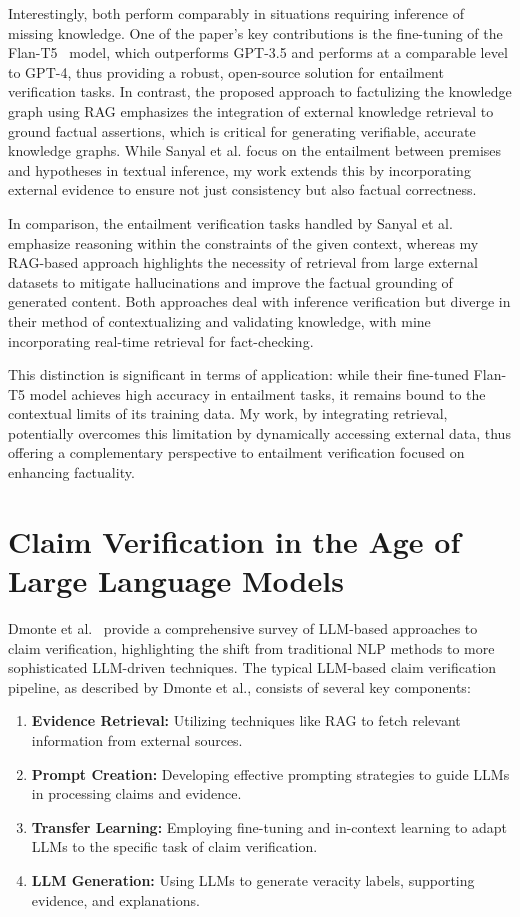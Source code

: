 Interestingly, both perform comparably in situations requiring inference of missing knowledge.
One of the paper's key contributions is the fine-tuning of the Flan-T5~\cite{https://doi.org/10.48550/arxiv.2210.11416} model, which outperforms GPT-3.5 and performs at a comparable level to GPT-4, thus providing a robust, open-source solution for entailment verification tasks.
In contrast, the proposed approach to factulizing the knowledge graph using \ac{RAG} emphasizes the integration of external knowledge retrieval to ground factual assertions, which is critical for generating verifiable, accurate knowledge graphs.
While Sanyal et al. focus on the entailment between premises and hypotheses in textual inference, my work extends this by incorporating external evidence to ensure not just consistency but also factual correctness.

In comparison, the entailment verification tasks handled by Sanyal et al. emphasize reasoning within the constraints of the given context, whereas my \ac{RAG}-based approach highlights the necessity of retrieval from large external datasets to mitigate hallucinations and improve the factual grounding of generated content.
Both approaches deal with inference verification but diverge in their method of contextualizing and validating knowledge, with mine incorporating real-time retrieval for fact-checking.

This distinction is significant in terms of application: while their fine-tuned Flan-T5 model achieves high accuracy in entailment tasks, it remains bound to the contextual limits of its training data.
My work, by integrating retrieval, potentially overcomes this limitation by dynamically accessing external data, thus offering a complementary perspective to entailment verification focused on enhancing factuality.

\section{Claim Verification in the Age of Large Language Models}\label{sec:claim-verification-in-the-age-of-large-language-models}
Dmonte et al.~\cite{dmonte2024claimverificationagelarge} provide a comprehensive survey of \ac{LLM}-based approaches to claim verification, highlighting the shift from traditional \ac{NLP} methods to more sophisticated LLM-driven techniques.
The typical LLM-based claim verification pipeline, as described by Dmonte et al., consists of several key components:
\begin{enumerate}
    \item \textbf{Evidence Retrieval:} Utilizing techniques like \ac{RAG} to fetch relevant information from external sources.
    \item \textbf{Prompt Creation:} Developing effective prompting strategies to guide LLMs in processing claims and evidence.
    \item \textbf{Transfer Learning:} Employing fine-tuning and in-context learning to adapt LLMs to the specific task of claim verification.
    \item \textbf{LLM Generation:} Using LLMs to generate veracity labels, supporting evidence, and explanations.
\end{enumerate}

